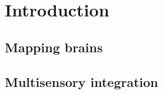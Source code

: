 
\chapter{Introduction}  

\section{Mapping brains} 
\label{section1.1}


\section{}
\label{section1.2}


\section{Multisensory integration} 
\label{section1.3}

